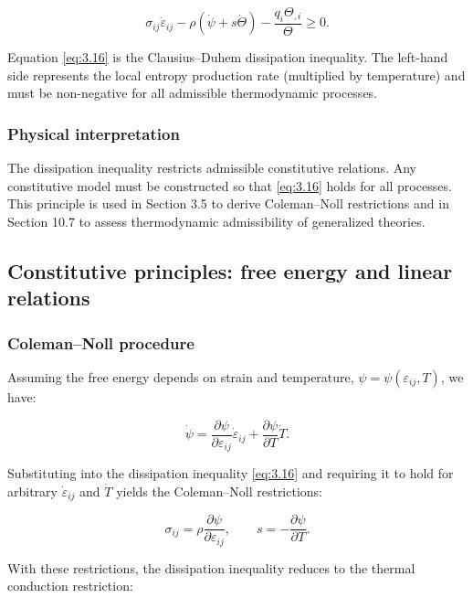 \begin{equation}
\sigma_{ij}\dot{\varepsilon}_{ij} - \rho\left(\dot{\psi} + s\dot{\Theta}\right) - \frac{q_i \Theta_{,i}}{\Theta} \geq 0.
\label{eq:3.16}
\end{equation}

Equation \eqref{eq:3.16} is the Clausius--Duhem dissipation inequality. The left-hand side represents the local entropy production rate (multiplied by temperature) and must be non-negative for all admissible thermodynamic processes.

\subsubsection{Physical interpretation}
The dissipation inequality restricts admissible constitutive relations. Any constitutive model must be constructed so that \eqref{eq:3.16} holds for all processes. This principle is used in Section 3.5 to derive Coleman--Noll restrictions and in Section 10.7 to assess thermodynamic admissibility of generalized theories.

\subsection{Constitutive principles: free energy and linear relations}
\label{sec:3.5}

\subsubsection{Coleman--Noll procedure}

Assuming the free energy depends on strain and temperature, $\psi = \psi(\varepsilon_{ij}, T)$, we have:

\begin{equation}
\dot{\psi} = \frac{\partial\psi}{\partial\varepsilon_{ij}}\dot{\varepsilon}_{ij}
+ \frac{\partial\psi}{\partial T}\dot{T}.
\label{eq:3.17}
\end{equation}

Substituting into the dissipation inequality \eqref{eq:3.16} and requiring it to hold for arbitrary $\dot{\varepsilon}_{ij}$ and $\dot{T}$ yields the Coleman--Noll restrictions:

\begin{equation}
\sigma_{ij} = \rho \frac{\partial\psi}{\partial\varepsilon_{ij}},
\qquad
s = -\frac{\partial\psi}{\partial T}.
\label{eq:3.18}
\end{equation}

With these restrictions, the dissipation inequality reduces to the thermal conduction restriction:


